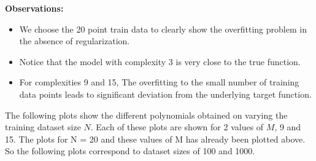 \documentclass{article}
\begin{document}
\textbf{Observations: \newline}
\begin{itemize}
\item We choose the 20 point train data to clearly show the overfitting problem in the absence of regularization. 
\item Notice that the model with complexity 3 is very close to the true function.
\item For complexities 9 and 15, The overfitting to the small number of training data points leads to significant deviation from the underlying target function.

\end{itemize}
\newpage
\begin{flushleft}
The following plots show the different polynomials obtained on varying the training dataset size $N$. Each of these plots are shown for 2 values of $M$, 9 and 15.
The plots for N = 20 and these values of M has already been plotted above. So the following plots correspond to dataset sizes of 100 and 1000. 
\end{flushleft}
\end{document}
